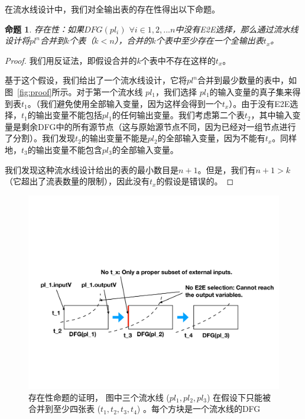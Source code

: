 \documentclass{ctexart}
\newtheorem{proof}{证明}
\newtheorem{proposition}{命题}
\begin{document}

在流水线设计中，我们对全输出表的存在性得出以下命题。

\begin{proposition}
\label{lp-prop1}
存在性：如果$DFG(pl_i)$ $\forall i \in 1, 2, ... n$中没有E2E选择，那么通过流水线设计将$pl^n$合并到$k$个表（$k < n$），合并的$k$个表中至少存在一个全输出表$t_x$。
\end{proposition}

\begin{proof}
我们用反证法，即假设合并的$k$个表中不存在这样的$t_x$。

基于这个假设，我们给出了一个流水线设计，它将$pl^n$合并到最少数量的表中，如图~\ref{fig:proof}所示。对于第一个流水线 $pl_1$，我们选择 $pl_1$的输入变量的真子集来得到表$t_1$。（我们避免使用全部输入变量，因为这样会得到一个$t_x$）。由于没有E2E选择，$t_1$的输出变量不能包括$pl_1$的任何输出变量。我们考虑第二个表$t_2$，其中输入变量是剩余DFG中的所有源节点（这与原始源节点不同，因为已经对一组节点进行了分割）。我们发现$t_2$的输出变量不能是$pl_2$的全部输入变量，因为不能有$t_x$。同样地，$t_3$的输出变量不能包含$pl_3$的全部输入变量。

我们发现这种流水线设计给出的表的最小数目是$n+1$。但是，我们有$n + 1 > k$（它超出了流表数量的限制），因此没有$t_x$的假设是错误的。
\end{proof}


\begin{figure}[!htbp]
\includegraphics[width=0.8\linewidth]{figures/lp-69.pdf}
\centering
\caption{\small 存在性命题的证明， 图中三个流水线 ($pl_1, pl_2, pl_3$) 在假设下只能被合并到至少四张表 ($t_1, t_2, t_3, t_4$) 。每个方块是一个流水线的DFG}
\end{figure}
\end{document}
